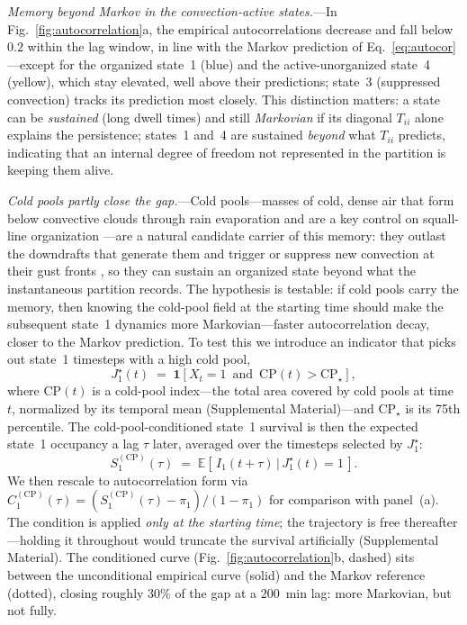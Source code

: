 \documentclass[
    aps,
    prl,
    reprint,
    superscriptaddress,
    amsmath,amssymb,
    floatfix,
    nofootinbib
]{revtex4-2}
\begin{document}
\emph{Memory beyond Markov in the convection-active states.}---In Fig.~\ref{fig:autocorrelation}a, the empirical autocorrelations decrease and fall below $0.2$ within the lag window, in line with the Markov prediction of Eq.~\eqref{eq:autocor}---except for the organized state~1 (blue) and the active-unorganized state~4 (yellow), which stay elevated, well above their predictions; state~3 (suppressed convection) tracks its prediction most closely. This distinction matters: a state can be \emph{sustained} (long dwell times) and still \emph{Markovian} if its diagonal $T_{ii}$ alone explains the persistence; states~1 and~4 are sustained \emph{beyond} what $T_{ii}$ predicts, indicating that an internal degree of freedom not represented in the partition is keeping them alive.

\emph{Cold pools partly close the gap.}---Cold pools---masses of cold, dense air that form below convective clouds through rain evaporation and are a key control on squall-line organization \cite{rotunno1988theory, houze1977structure, tompkins2001coldpools, abramian2022shear}---are a natural candidate carrier of this memory: they outlast the downdrafts that generate them and trigger or suppress new convection at their gust fronts \cite{torri2015mechanisms}, so they can sustain an organized state beyond what the instantaneous partition records. The hypothesis is testable: if cold pools carry the memory, then knowing the cold-pool field at the starting time should make the subsequent state~1 dynamics more Markovian---faster autocorrelation decay, closer to the Markov prediction. To test this we introduce an indicator that picks out state~1 timesteps with a high cold pool,
\begin{equation}
J_1^\star(t) \;=\; \mathbf{1}\!\left[X_t = 1 \,\text{ and }\, \mathrm{CP}(t) > \mathrm{CP}_\star\right],
\end{equation}
where $\mathrm{CP}(t)$ is a cold-pool index---the total area covered by cold pools at time $t$, normalized by its temporal mean (Supplemental Material)---and $\mathrm{CP}_\star$ is its 75th percentile. The cold-pool-conditioned state~1 survival is then the expected state~1 occupancy a lag $\tau$ later, averaged over the timesteps selected by $J_1^\star$:
\begin{equation}
S^{(\mathrm{CP})}_1(\tau) \;=\; \mathbb{E}\!\left[\,I_1(t+\tau) \,\big|\, J_1^\star(t) = 1\,\right].
\end{equation}
We then rescale to autocorrelation form via $C^{(\mathrm{CP})}_1(\tau) = (S^{(\mathrm{CP})}_1(\tau) - \pi_1)/(1-\pi_1)$ for comparison with panel~(a). The condition is applied \emph{only at the starting time}; the trajectory is free thereafter---holding it throughout would truncate the survival artificially (Supplemental Material). The conditioned curve (Fig.~\ref{fig:autocorrelation}b, dashed) sits between the unconditional empirical curve (solid) and the Markov reference (dotted), closing roughly $30\%$ of the gap at a $200$~min lag: more Markovian, but not fully.
\end{document}
